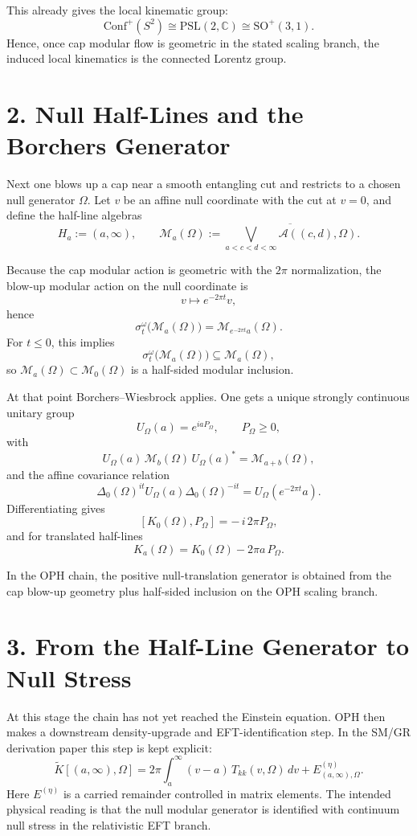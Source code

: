 \documentclass[10pt]{article}
\newcommand{\Conf}{\mathrm{Conf}}
\begin{document}
This already gives the local kinematic group:
\[
\Conf^+(S^2) \cong \mathrm{PSL}(2,\mathbb C) \cong \mathrm{SO}^+(3,1).
\]
Hence, once cap modular flow is geometric in the stated scaling branch, the induced local kinematics is the connected Lorentz group.

\section*{2. Null Half-Lines and the Borchers Generator}

Next one blows up a cap near a smooth entangling cut and restricts to a chosen null generator \(\Omega\). Let \(v\) be an affine null coordinate with the cut at \(v=0\), and define the half-line algebras
\[
H_a := (a,\infty),
\qquad
\mathcal M_a(\Omega)
:=
\overline{\bigvee_{a<c<d<\infty}\mathcal A((c,d),\Omega)}.
\]

Because the cap modular action is geometric with the \(2\pi\) normalization, the blow-up modular action on the null coordinate is
\[
v \mapsto e^{-2\pi t} v,
\]
hence
\[
\sigma_t^\omega\bigl(\mathcal M_a(\Omega)\bigr)
=
\mathcal M_{e^{-2\pi t}a}(\Omega).
\]
For \(t \le 0\), this implies
\[
\sigma_t^\omega\bigl(\mathcal M_a(\Omega)\bigr) \subseteq \mathcal M_a(\Omega),
\]
so \(\mathcal M_a(\Omega) \subset \mathcal M_0(\Omega)\) is a half-sided modular inclusion.

At that point Borchers--Wiesbrock applies. One gets a unique strongly continuous unitary group
\[
U_\Omega(a) = e^{i a P_\Omega},
\qquad
P_\Omega \ge 0,
\]
with
\[
U_\Omega(a)\,\mathcal M_b(\Omega)\,U_\Omega(a)^* = \mathcal M_{a+b}(\Omega),
\]
and the affine covariance relation
\[
\Delta_0(\Omega)^{it} U_\Omega(a)\Delta_0(\Omega)^{-it}
=
U_\Omega(e^{-2\pi t} a).
\]
Differentiating gives
\[
[K_0(\Omega),P_\Omega] = -\,i\,2\pi P_\Omega,
\]
and for translated half-lines
\[
K_a(\Omega)=K_0(\Omega)-2\pi a\,P_\Omega.
\]

In the OPH chain, the positive null-translation generator is obtained from the cap blow-up geometry plus half-sided inclusion on the OPH scaling branch.

\section*{3. From the Half-Line Generator to Null Stress}

At this stage the chain has not yet reached the Einstein equation. OPH then makes a downstream density-upgrade and EFT-identification step. In the SM/GR derivation paper this step is kept explicit:
\[
\widetilde K[(a,\infty),\Omega]
=
2\pi\int_a^\infty (v-a)\,T_{kk}(v,\Omega)\,dv
+
E^{(\eta)}_{(a,\infty),\Omega}.
\]
Here \(E^{(\eta)}\) is a carried remainder controlled in matrix elements. The intended physical reading is that the null modular generator is identified with continuum null stress in the relativistic EFT branch.
\end{document}
